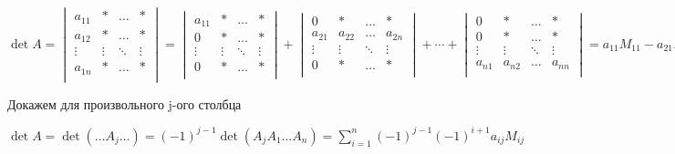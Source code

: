 \begin{enumerate}
          \(\det A =
          \begin{vmatrix}
              a_{11} & *      & \ldots & *      \\
              a_{12} & *      & \ldots & *      \\
              \vdots & \vdots & \ddots & \vdots \\
              a_{1n} & *      & \ldots & *      \\
          \end{vmatrix} =
          \begin{vmatrix}
              a_{11} & *      & \ldots & *      \\
              0      & *      & \ldots & *      \\
              \vdots & \vdots & \ddots & \vdots \\
              0      & *      & \ldots & *      \\
          \end{vmatrix} +
          \begin{vmatrix}
              0      & *      & \ldots & *      \\
              a_{21} & a_{22} & \ldots & a_{2n} \\
              \vdots & \vdots & \ddots & \vdots \\
              0      & *      & \ldots & *      \\
          \end{vmatrix} + \cdots +
          \begin{vmatrix}
              0      & *      & \ldots & *      \\
              0      & *      & \ldots & *      \\
              \vdots & \vdots & \ddots & \vdots \\
              a_{n1} & a_{n2} & \ldots & a_{nn} \\
          \end{vmatrix} = a_{11} M_{11} - a_{21} M_{21} + a_{31} M_{31} - \ldots + (-1)^{n-1} a_{n1} M_{n1} = \sum\limits_{i = 1}^n (-1)^{i + 1} M_{i1} a_{i1}\)


          Докажем для произвольного j-ого столбца

          \(\det A = \det (\ldots A_j \ldots) = (-1)^{j-1} \det (A_j A_1 \ldots A_n) = \sum\limits_{i=1}^n(-1)^{j-1}(-1)^{i+1} a_{ij} M_{ij}\)





\end{enumerate}
